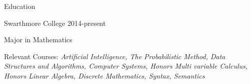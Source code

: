 \documentclass[12pt]{resume} %
\begin{document}

\begin{rSection}{Education}
    \begin{rSubsection}{Swarthmore College }{2014-present}{}{}
        \item Major in Mathematics
        \item Relevant Courses:
            {\em
                Artificial Intelligence,
                The Probabilistic Method,
                Data Structures and Algorithms,
                Computer Systems,
                Honors Multi variable Calculus,
                Honors Linear Algebra,
                Discrete Mathematics,
                Syntax,
                Semantics
            }
    \end{rSubsection}
\end{rSection}

\end{document}
